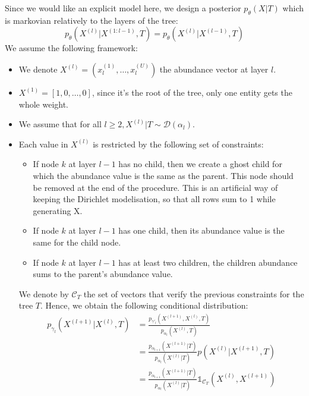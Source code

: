 Since we would like an explicit model here, we design a posterior $p_{\theta}(X|T)$ which is markovian relatively to the layers of the tree:
$$
p_{\theta}(X^{(l)} | X^{(1:l-1)}, T) = p_{\theta}(X^{(l)} | X^{(l-1)}, T)
$$
We assume the following framework:
\begin{itemize}
    \item We denote $X^{(l)} = (x_l^{(1)}, \dots, x_{l}^{(U)})$ the abundance vector at layer $l$.
    \item $X^{(1)} = [1, 0, \dots, 0]$, since it's the root of the tree, only one entity gets the whole weight.
    \item We assume that for all $l \geq 2, X^{(l)} | T \sim \mathcal{D}(\alpha_l)$.
    \item Each value in $X^{(l)}$ is restricted by the following set of constraints:
        \begin{itemize}
              \item If node $k$ at layer $l-1$ has no child, then we create a ghost child for which the abundance value is the same as the parent.
                    This node should be removed at the end of the procedure.
                    This is an artificial way of keeping the Dirichlet modelisation, so that all rows sum to 1 while generating X.
              \item If node $k$ at layer $l-1$ has one child, then its abundance value is the same for the child node.
              \item If node $k$ at layer $l-1$ has at least two children, the children abundance sums to the parent's abundance value.
        \end{itemize}
        We denote by $\mathcal{C}_T$ the set of vectors that verify the previous constraints for the tree $T$.
        Hence, we obtain the following conditional distribution:
        $$
        \begin{align}
            p_{\gamma_l}(X^{(l+1)} | X^{(l)}, T) &= \frac{p_{\gamma'_l}(X^{(l+1)}, X^{(l)}, T)}{p_{\alpha_l}(X^{(l)}, T)} \\
                                            &= \frac{p_{\alpha_{l+1}}(X^{(l+1)} | T)}{p_{\alpha_{l}}(X^{(l)} | T)} p(X^{(l)} | X^{(l+1)}, T) \\
                                            &= \frac{p_{\alpha_{l+1}}(X^{(l+1)} | T)}{p_{\alpha_{l}}(X^{(l)} | T)} \mathds{1}_{\mathcal{C}_T}\left(X^{(l)}, X^{(l+1)}\right)
        \end{align}
        $$
\end{itemize}

